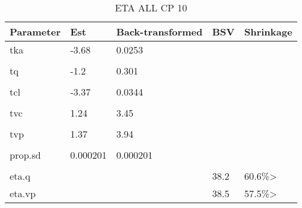 \begin{table}
\centering\centering
\caption{ETA ALL CP 10}
\centering
\fontsize{8}{10}\selectfont
\begin{tabular}[t]{lllll}
\toprule
\textbf{Parameter} & \textbf{Est} & \textbf{Back-transformed} & \textbf{BSV} & \textbf{Shrinkage}\\
\midrule
tka & -3.68 & 0.0253 &  & \\
\midrule\\
tq & -1.2 & 0.301 &  & \\
\midrule\\
tcl & -3.37 & 0.0344 &  & \\
\midrule\\
tvc & 1.24 & 3.45 &  & \\
\midrule\\
tvp & 1.37 & 3.94 &  & \\
\midrule\\
prop.sd & 0.000201 & 0.000201 &  & \\
\midrule\\
eta.q &  &  & 38.2 & 60.6\%>\\
\midrule
eta.vp &  &  & 38.5 & 57.5\%>\\
\bottomrule
\end{tabular}
\end{table}
